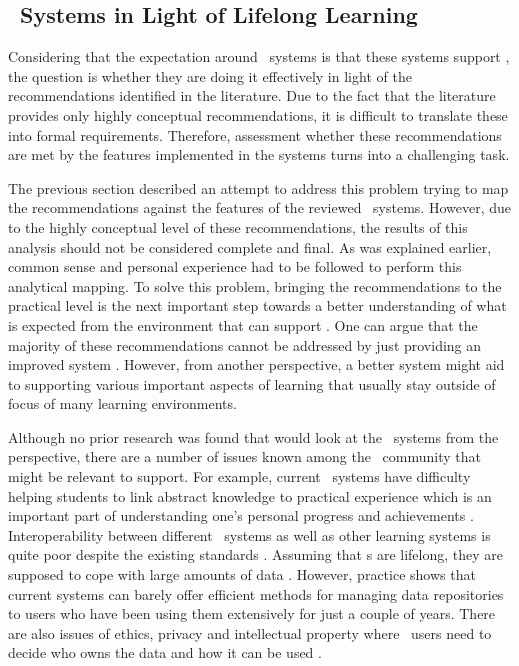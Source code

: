 \subsection{\ep~Systems in Light of Lifelong Learning}

Considering that the expectation around \ep~systems is that these systems
support \LLLsn, the question is whether they are doing it effectively in light
of the recommendations identified in the literature. Due to the fact that the
literature provides only highly conceptual recommendations, it is difficult to
translate these into formal requirements. Therefore, assessment whether these
recommendations are met by the features implemented in the systems turns into a
challenging task. 

The previous section described an attempt to address this problem trying to map
the recommendations against the features of the reviewed \ep~systems. However,
due to the highly conceptual level of these recommendations, the results of this
analysis should not be considered complete and final. As was explained earlier,
common sense and personal experience had to be followed to perform this
analytical mapping. To solve this problem, bringing the recommendations to the
practical level is the next important step towards a better understanding of
what is expected from the environment that can support \LLLsn. One can argue
that the majority of these recommendations cannot be addressed by just providing
an improved system \citep{Schaffert2008}. However, from another perspective, a
better system might aid to supporting various important aspects of learning that
usually stay outside of focus of many learning environments.

Although no prior research was found that would look at the \ep~systems from the
\LLLs perspective, there are a number of issues known among the \ep~community
that might be relevant to \LLLs support. For example, current \ep~systems have
difficulty helping students to link abstract knowledge to practical experience
which is an important part of understanding one's personal progress and
achievements \citep{Chou2009}. Interoperability between different \ep~systems as
well as other learning systems is quite poor despite the existing standards
\citep{Clark2011}. Assuming that \ep s are lifelong, they are supposed to cope
with large amounts of data \citep{Butler2010}. However, practice shows that
current systems can barely offer efficient methods for managing data
repositories to users who have been using them extensively for just a couple of
years. There are also issues of ethics, privacy and intellectual property where
\ep~users need to decide who owns the data and how it can be used
\citep{Challis2005}.

